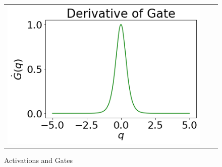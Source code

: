 \begin{figure}[h]
{\begin{tabular}{ccc}
\includegraphics[scale=0.5]{figs/der-gate.png}
\end{tabular}
}
\caption{Activations and Gates}
\label{fig:actgate}
\end{figure}


